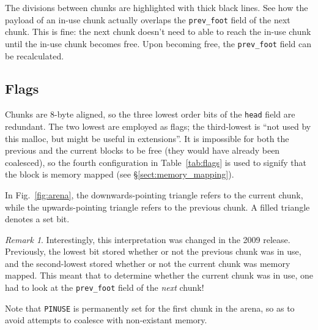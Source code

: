 \documentclass[12pt,a4paper]{article}
\theoremstyle{remark}
\newtheorem*{remark}{Remark}
\begin{document}
The divisions between chunks are highlighted with thick black lines. See how the payload of an in-use chunk actually overlaps the {\tt prev\_foot} field of the next chunk. This is fine: the next chunk doesn't need to able to reach the in-use chunk until the in-use chunk becomes free. Upon becoming free, the {\tt prev\_foot} field can be recalculated.

\subsection{Flags}

Chunks are 8-byte aligned, so the three lowest order bits of the {\tt head} field are redundant. The two lowest are employed as flags; the third-lowest is ``not used by this malloc, but might be useful in extensions''. It is impossible for both the previous and the current blocks to be free (they would have already been coalesced), so the fourth configuration in Table~\ref{tab:flags} is used to signify that the block is memory mapped (see \S\ref{sect:memory_mapping}).
\begin{table}
\caption{The flags in each chunk's {\tt head} field}
\label{tab:flags}
\end{table}
In Fig.~\ref{fig:arena}, the downwards-pointing triangle refers to the current chunk, while the upwards-pointing triangle refers to the previous chunk. A filled triangle denotes a set bit.

\begin{remark}Interestingly, this interpretation was changed in the 2009 release. Previously, the lowest bit stored whether or not the previous chunk was in use, and the second-lowest stored whether or not the current chunk was memory mapped. This meant that to determine whether the current chunk was in use, one had to look at the {\tt prev\_foot} field of the \emph{next} chunk!
\end{remark}

Note that {\tt PINUSE} is permanently set for the first chunk in the arena, so as to avoid attempts to coalesce with non-existant memory.
\end{document}
